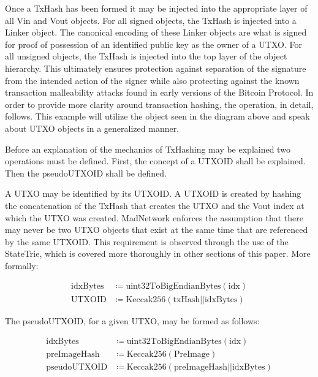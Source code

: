Once a TxHash has been formed it may be injected into the appropriate layer of
all Vin and Vout objects.
For all signed objects, the TxHash is injected into a Linker object.
The canonical encoding of these Linker objects are what is signed for proof
of possession of an identified public key as the owner of a UTXO.
For all unsigned objects, the TxHash is injected into the top layer of the
object hierarchy.
This ultimately ensures protection against separation of the signature from the
intended action of the signer while also protecting against the known
transaction malleability attacks found in early versions of the Bitcoin
Protocol.
In order to provide more clarity around transaction hashing, the operation, in
detail, follows.
This example will utilize the \TxIn{} object seen in the diagram above and speak
about UTXO objects in a generalized manner.

Before an explanation of the mechanics of TxHashing may be explained two
operations must be defined.
First, the concept of a UTXOID shall be explained.
Then the pseudoUTXOID shall be defined.

A UTXO may be identified by its UTXOID.
A UTXOID is created by hashing the concatenation of the TxHash that creates the
UTXO and the Vout index at which the UTXO was created.
MadNetwork enforces the assumption that there may never be two UTXO objects
that exist at the same time that are referenced by the same UTXOID.
This requirement is observed through the use of the StateTrie, which is covered
more thoroughly in other sections of this paper.
More formally:

\begin{align*}
    \text{idxBytes} &\coloneqq \text{uint32ToBigEndianBytes}(\text{idx}) \\
    \text{UTXOID} &\coloneqq \text{Keccak256}(\text{txHash}||\text{idxBytes})
\end{align*}

\noindent
The pseudoUTXOID, for a given UTXO, may be formed as follows:

\begin{align*}
    \text{idxBytes} &\coloneqq \text{uint32ToBigEndianBytes}(\text{idx}) \\
    \text{preImageHash} &\coloneqq \text{Keccak256}(\text{PreImage}) \\
    \text{pseudoUTXOID} &\coloneqq \text{Keccak256}(\text{preImageHash} ||
        \text{idxBytes})
\end{align*}


